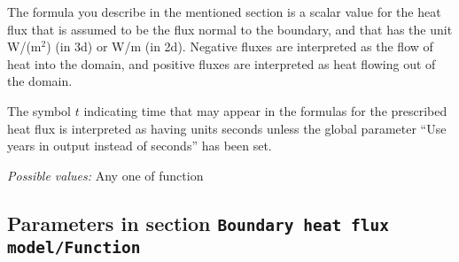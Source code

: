 \begin{itemize}
The formula you describe in the mentioned section is a scalar value for the heat flux that is assumed to be the flux normal to the boundary, and that has the unit W/(m$^2$) (in 3d) or W/m (in 2d). Negative fluxes are interpreted as the flow of heat into the domain, and positive fluxes are interpreted as heat flowing out of the domain.

The symbol $t$ indicating time that may appear in the formulas for the prescribed heat flux is interpreted as having units seconds unless the global parameter ``Use years in output instead of seconds'' has been set.


{\it Possible values:} Any one of function
\end{itemize}



\subsection{Parameters in section \tt Boundary heat flux model/Function}
\label{parameters:Boundary_20heat_20flux_20model/Function}

